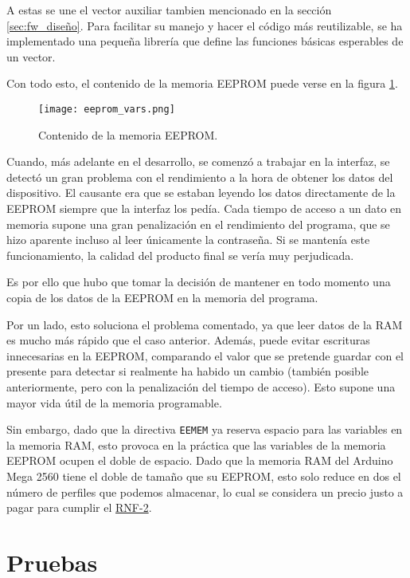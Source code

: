 A estas se une el vector auxiliar tambien mencionado en la sección \ref{sec:fw_diseño}. Para facilitar su manejo y hacer el código más reutilizable, se ha implementado una pequeña librería que define las funciones básicas esperables de un vector.

Con todo esto, el contenido de la memoria EEPROM puede verse en la figura \ref{fig:eeprom_vars}.

\begin{figure}[h!]
    \centering
    \texttt{[image: eeprom\_vars.png]}
    \caption{Contenido de la memoria EEPROM.}
    \label{fig:eeprom_vars}
\end{figure}

Cuando, más adelante en el desarrollo, se comenzó a trabajar en la interfaz, se detectó un gran problema con el rendimiento a la hora de obtener los datos del dispositivo. El causante era que se estaban leyendo los datos directamente de la EEPROM siempre que la interfaz los pedía. Cada tiempo de acceso a un dato en memoria supone una gran penalización en el rendimiento del programa, que se hizo aparente incluso al leer únicamente la contraseña. Si se mantenía este funcionamiento, la calidad del producto final se vería muy perjudicada.

Es por ello que hubo que tomar la decisión de mantener en todo momento una copia de los datos de la EEPROM en la memoria del programa.

Por un lado, esto soluciona el problema comentado, ya que leer datos de la RAM es mucho más rápido que el caso anterior. Además, puede evitar escrituras innecesarias en la EEPROM, comparando el valor que se pretende guardar con el presente para detectar si realmente ha habido un cambio (también posible anteriormente, pero con la penalización del tiempo de acceso). Esto supone una mayor vida útil de la memoria programable.

Sin embargo, dado que la directiva \verb|EEMEM| ya reserva espacio para las variables en la memoria RAM, esto provoca en la práctica que las variables de la memoria EEPROM ocupen el doble de espacio. Dado que la memoria RAM del Arduino Mega 2560 tiene el doble de tamaño que su EEPROM, esto solo reduce en dos el número de perfiles que podemos almacenar, lo cual se considera un precio justo a pagar para cumplir el \hyperref[tab:rnf2]{RNF-2}.

\section{Pruebas}

